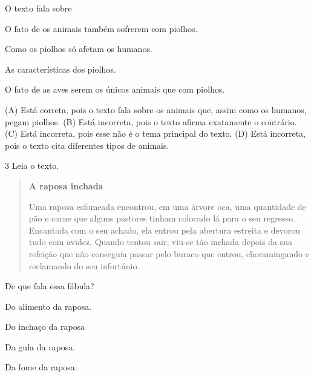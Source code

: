 
O texto fala sobre

\begin{escolha}
\item O fato de os animais também sofrerem com piolhos.

\item Como os piolhos só afetam os humanos.

\item As características dos piolhos.

\item O fato de as aves serem os únicos animais que com piolhos.
\end{escolha}


(A) Está correta, pois o texto fala sobre os animais que, assim como os humanos, pegam piolhos.
(B) Está incorreta, pois o texto afirma exatamente o contrário.
(C) Está incorreta, pois esse não é o tema principal do texto.
(D) Está incorreta, pois o texto cita diferentes tipos de animais.

\num{3} Leia o texto.

\begin{quote}
\textbf{A raposa inchada}

Uma raposa esfomeada encontrou, em uma árvore oca, uma quantidade de pão e
carne que alguns pastores tinham colocado lá para o seu regresso.
Encantada com o seu achado, ela entrou pela abertura estreita e devorou
tudo com avidez. Quando tentou sair, viu-se tão inchada depois da sua
refeição que não conseguia passar pelo buraco que entrou, choramingando e reclamando do seu infortúnio.
\end{quote}


De que fala essa fábula?

\begin{escolha}
\item Do alimento da raposa.

\item Do inchaço da raposa

\item Da gula da raposa.

\item Da fome da raposa.
\end{escolha}

